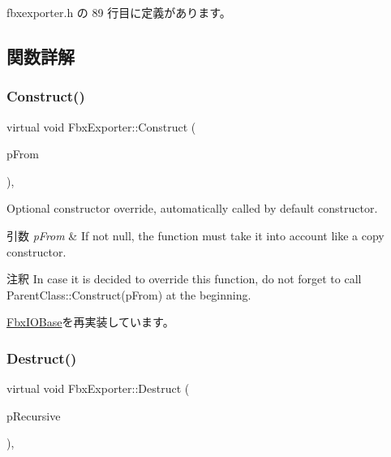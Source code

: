  fbxexporter.\+h の 89 行目に定義があります。



\subsection{関数詳解}
\mbox{\label{class_fbx_exporter_aa308b9a9901e8c98d0b54f0bd20daad2}} 
\subsubsection{\texorpdfstring{Construct()}{Construct()}}
{\footnotesize\ttfamily virtual void Fbx\+Exporter\+::\+Construct (\begin{DoxyParamCaption}\item[{const \hyperlink{class_fbx_object}{Fbx\+Object} $\ast$}]{p\+From }\end{DoxyParamCaption})\hspace{0.3cm}{\ttfamily [protected]}, {\ttfamily [virtual]}}

Optional constructor override, automatically called by default constructor. 
\begin{DoxyParams}{引数}
{\em p\+From} & If not null, the function must take it into account like a copy constructor. \\
\hline
\end{DoxyParams}
\begin{DoxyRemark}{注釈}
In case it is decided to override this function, do not forget to call Parent\+Class\+::\+Construct(p\+From) at the beginning. 
\end{DoxyRemark}


\hyperlink{class_fbx_i_o_base_aed70ed1326f8fb1cc96e2086c73722f8}{Fbx\+I\+O\+Base}を再実装しています。

\mbox{\label{class_fbx_exporter_a0a2569f6ed2ffaa165d9bdb1959f0599}} 
\subsubsection{\texorpdfstring{Destruct()}{Destruct()}}
{\footnotesize\ttfamily virtual void Fbx\+Exporter\+::\+Destruct (\begin{DoxyParamCaption}\item[{bool}]{p\+Recursive }\end{DoxyParamCaption})\hspace{0.3cm}{\ttfamily [protected]}, {\ttfamily [virtual]}}

